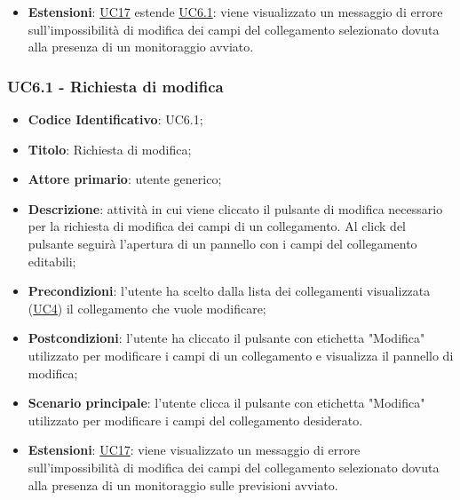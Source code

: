 \begin{itemize}
				\item\textbf{Estensioni}: \hyperref[par:UC17]{UC17} estende \hyperref[par:UC6.1]{UC6.1}: viene visualizzato un messaggio di errore sull'impossibilità di modifica dei campi del collegamento selezionato dovuta alla presenza di un monitoraggio avviato.
		\end{itemize}

\label{par:UC6.1}
	\subsubsection{UC6.1 - Richiesta di modifica}
		\begin{itemize}
			\item\textbf{Codice Identificativo}: UC6.1;
			\item\textbf{Titolo}: Richiesta di modifica;
			\item\textbf{Attore primario}: utente generico;
			\item\textbf{Descrizione}: attività in cui viene cliccato il pulsante di modifica necessario per la richiesta di modifica dei campi di un collegamento. Al click del pulsante seguirà l'apertura di un pannello con i campi del collegamento editabili;
			\item\textbf{Precondizioni}: l'utente ha scelto dalla lista dei collegamenti visualizzata (\hyperref[par:UC4]{UC4}) il collegamento che vuole modificare;
			\item\textbf{Postcondizioni}: l'utente ha cliccato il pulsante con etichetta "Modifica" utilizzato per modificare i campi di un collegamento e visualizza il pannello di modifica;
			\item\textbf{Scenario principale}: l'utente clicca il pulsante con etichetta "Modifica" utilizzato per modificare i campi del collegamento desiderato.
			\item\textbf{Estensioni}: \hyperref[par:UC17]{UC17}: viene visualizzato un messaggio di errore sull'impossibilità di modifica dei campi del collegamento selezionato dovuta alla presenza di un monitoraggio sulle previsioni avviato.					
	
		\end{itemize}		
		
	\label{par:UC6.2}
